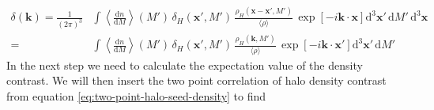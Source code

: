 \documentclass[oneside]{book}
\newcommand*{\rd}{\mathrm{d}}
\begin{document}
\begin{align}
    \delta(\boldsymbol{k}) = \frac{1}{(2\pi)^3}&\int \left\langle  \frac{\rd n}{\rd M} \right\rangle(M')\,\delta_H(\boldsymbol{x}',M') \,\frac{\rho_H(\boldsymbol{x}-\boldsymbol{x}',M')}{\langle \rho \rangle}\,\exp[{-i\boldsymbol{k}\cdot\boldsymbol{x}}] \rd^3 \boldsymbol{x}' \,\rd M'\,\rd^3\boldsymbol{x}\\
    =&\int \left\langle  \frac{\rd n}{\rd M} \right\rangle(M')\,\delta_H(\boldsymbol{x}',M') \,\frac{\rho_H(\boldsymbol{k},M')}{\langle \rho \rangle}\,\exp[{-i\boldsymbol{k}\cdot\boldsymbol{x}'}] \rd^3 \boldsymbol{x}' \,\rd M'
\end{align} 
In the next step we need to calculate the expectation value of the density contrast. We will then insert the two point correlation of halo density contrast from equation \ref{eq:two-point-halo-seed-density} to find
\end{document}
